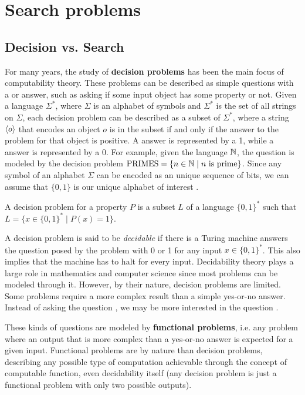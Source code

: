 
\chapter{Search problems} \label{chap:search_problems}

\section{Decision vs. Search}

For many years, the study of \textbf{decision problems} has been the main focus of computability theory. These problems can be described as simple questions with a  or  answer, such as asking if some input object has some property or not. Given a language $\Sigma^*$, where $\Sigma$ is an alphabet of symbols and $\Sigma^*$ is the set of all strings on $\Sigma$, each decision problem can be described as a subset of $\Sigma^*$, where a string $\left\langle o\right\rangle$ that encodes an object $o$ is in the subset if and only if the answer to the problem for that object is positive. A  answer is represented by a 1, while a  answer is represented by a 0. For example, given the language $\mathbb{N}$, the question  is modeled by the decision problem $\mathrm{PRIMES} = \{n \in \mathbb{N} \mid n \text{ is prime}\}$. Since any symbol of an alphabet $\Sigma$ can be encoded as an unique sequence of bits, we can assume that $\{0,1\}$ is our unique alphabet of interest \cite{complexity_arora_barak,sipser_computation}.

\begin{definition}
 A decision problem for a property $P$ is a subset $L$ of a language $\{0,1\}^*$ such that $L = \{x \in \{0,1\}^* \mid P(x) = 1\}$.
\end{definition}

A decision problem is said to be \textit{decidable} if there is a Turing machine answers the question posed by the problem with 0 or 1 for any input $x \in \{0,1\}^*$. This also implies that the machine has to halt for every input. Decidability theory plays a large role in mathematics and computer science since most problems can be modeled through it. However, by their nature, decision problems are limited. Some problems require a more complex result than a simple yes-or-no answer. Instead of asking the question , we may be more interested in the question .

These kinds of questions are modeled by \textbf{functional problems}, i.e. any problem where an output that is more complex than a yes-or-no answer is expected for a given input. Functional problems are by nature  than decision problems, describing any possible type of computation achievable through the concept of computable function, even decidability itself (any decision problem is just a functional problem with only two possible outputs).

